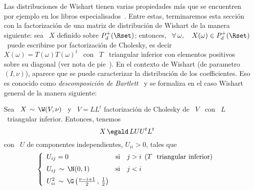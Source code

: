 Las distribuciones de Wishart tienen  varias propiedades m\'as que se encuentren
por ejemplo  en los  libros especialisados~\cite{Mui82, GupNad99,  And03, Seb04,
  NadKot04}. Entre estas, terminaremos  esta secci\'on con la factorizaci\'on de
una  matriz de  distribuci\'on de  Wishart  de la  manera siguiente:  sea \  $X$
definido sobre  $P_d^+(\Rset)$; entonces, \ $\forall \:  \omega, \quad X(\omega)
\in P_d^+(\Rset)$ \ puede escribirse por factorizaci\'on de Cholesky, es decir \
$X(\omega)  = T(\omega)  T(\omega)^t$  \ con  \  $T$ \  triangular inferior  con
elementos     positivos      sobre     su     diagonal      (ver     nota     de
pie~\footref{Foot:MP:WishartXtilde}).  En  el contexto de  Wishart (de parametro
$(I,\nu)$),  aparece  que  se   puede  caracterizar  la  distribuci\'on  de  los
coefficientes.     Eso    es   conocido    como    {\em   descomposici\'on    de
  Bartlett}~\cite{Bar34,  Mui82,  BilBre99,  GupNag99,  And03,  NadKot04}  y  se
formaliza en el caso Wishart general de la manera siguiente:
%
\begin{teorema}\label{Teo:MP:Bartlett}
%
  Sea \ $X \, \sim \, \W(V,\nu)$ \  y \ $V = L L^t$ factorizaci\'on de Cholesky
  de \ $V$ \ con \ $L$ \ triangular inferior. Entonces, tenemos
  \[
  X \, \egald \, L U U^t L^t
  \]
  con \ $U$ de componentes independientes, $U_{ii} > 0$, tales que
  \[
  \left\{\begin{array}{lll}
  U_{ij} = 0 & \mbox{si} & j > i \:\: \mbox{($T$ \ triangular inferior)}\\[2mm]
  U_{ij} \, \sim \, \N(0,1) & \mbox{si} & j < i\\[2mm]
  U_{ii}^2 \, \sim \, \G\left( \frac{\nu-i+1}{2} \, , \, \frac12 \right) & &
  \end{array}\right.
  \]
\end{teorema}
%
